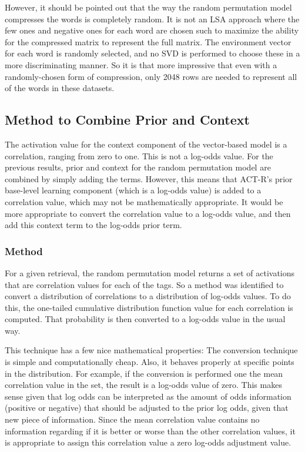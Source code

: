 \documentclass[man,floatsintext,donotrepeattitle]{apa6}
\begin{document}
However, it should be pointed out that the way the random permutation model compresses the words is completely random.
It is not an LSA approach where the few ones and negative ones for each word are chosen such to maximize the ability for the compressed matrix to represent the full matrix.
The environment vector for each word is randomly selected, and no SVD is performed to choose these in a more discriminating manner.
So it is that more impressive that even with a randomly-chosen form of compression, only \num{2048} rows are needed to represent all of the words in these datasets.

\subsection{Method to Combine Prior and Context}

The activation value for the context component of the vector-based model is a correlation, ranging from zero to one.
This is not a log-odds value.
For the previous results, prior and context for the random permutation model are combined by simply adding the terms.
However, this means that ACT-R's prior base-level learning component (which is a log-odds value) is added to a correlation value, which may not be mathematically appropriate.
It would be more appropriate to convert the correlation value to a log-odds value, and then add this context term to the log-odds prior term.

\subsubsection{Method}

For a given retrieval, the random permutation model returns a set of activations that are correlation values for each of the tags.
So a method was identified to convert a distribution of correlations to a distribution of log-odds values.
To do this, the one-tailed cumulative distribution function value for each correlation is computed.
That probability is then converted to a log-odds value in the usual way. 

This technique has a few nice mathematical properties:
The conversion technique is simple and computationally cheap.
Also, it behaves properly at specific points in the distribution.
For example, if the conversion is performed one the mean correlation value in the set, the result is a log-odds value of zero.
This makes sense given that log odds can be interpreted as the amount of odds information (positive or negative) that should be adjusted to the prior log odds, given that new piece of information.
Since the mean correlation value contains no information regarding if it is better or worse than the other correlation values, it is appropriate to assign this correlation value a zero log-odds adjustment value.
\end{document}
